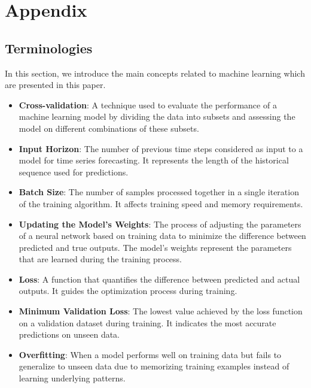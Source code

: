 \chapter{Appendix}
\label{appendix}

\section{Terminologies}
\label{terminologies_appendix}
In this section, we introduce the main concepts related to machine learning which are presented in this paper.

\begin{itemize}
    \item \textbf{Cross-validation}: A technique used to evaluate the performance of a machine learning model by dividing the data into subsets and assessing the model on different combinations of these subsets.

    \item \textbf{Input Horizon}: The number of previous time steps considered as input to a model for time series forecasting. It represents the length of the historical sequence used for predictions.
    
    \item \textbf{Batch Size}: The number of samples processed together in a single iteration of the training algorithm. It affects training speed and memory requirements.
    
    \item \textbf{Updating the Model's Weights}: The process of adjusting the parameters of a neural network based on training data to minimize the difference between predicted and true outputs. The model's weights represent the parameters that are learned during the training process.
    
    \item \textbf{Loss}: A function that quantifies the difference between predicted and actual outputs. It guides the optimization process during training.
    
    \item \textbf{Minimum Validation Loss}: The lowest value achieved by the loss function on a validation dataset during training. It indicates the most accurate predictions on unseen data.
    
    \item \textbf{Overfitting}: When a model performs well on training data but fails to generalize to unseen data due to memorizing training examples instead of learning underlying patterns.
    

\end{itemize}
